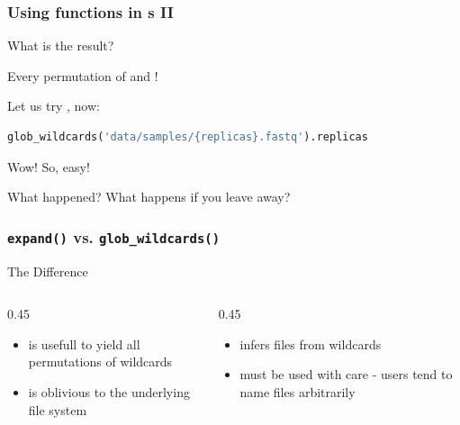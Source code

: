 \begin{frame}[fragile]
  \frametitle{Using functions in s II}
  \begin{question}
  	What is the result?
  \end{question}
  \pause
  \begin{hint}[Answer:]
  	Every permutation of  and !
  \end{hint}
  \pause
  Let us try , now:
  \begin{lstlisting}[language=Python,style=Python]
glob_wildcards('data/samples/{replicas}.fastq').replicas
  \end{lstlisting}
  \pause
  Wow! So, easy!
  \begin{question}
  	What happened? What happens if you leave  away?
  \end{question}
\end{frame}

\begin{frame}[fragile]
  \frametitle{\texttt{expand()} vs. \texttt{glob\_wildcards()}}
  \begin{exampleblock}{The Difference}
    \begin{columns}
      \begin{column}{0.45\textwidth}
        \begin{itemize}
         \item {} is usefull to yield all permutations of wildcards
         \item {} is oblivious to the underlying file system
        \end{itemize}

      \end{column}
      \begin{column}{0.45\textwidth}
        \begin{itemize}
         \item {} infers files from wildcards
         \item {} must be used with care - users tend to name files arbitrarily
        \end{itemize}

      \end{column}
    \end{columns}
  \end{exampleblock}
\end{frame}

